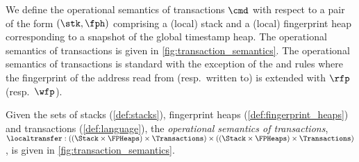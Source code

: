 We define the operational semantics of transactions $\cmd$ with respect to a pair of the form $(\stk, \fph)$ comprising a (local) stack and a (local) fingerprint heap corresponding to a snapshot of the global timestamp heap. The operational semantics of transactions is given in \fig\ref{fig:transaction_semantics}.
The operational semantics of transactions is standard with the exception of the  and  rules where the fingerprint of the address read from (resp.~written to) is extended with $\rfp$ (resp.~$\wfp$).


\begin{definition}
Given the sets of stacks (\ref{def:stacks}), fingerprint heaps (\ref{def:fingerprint_heaps}) and transactions (\ref{def:language}), the \emph{operational semantics of transactions}, $\localtransfer : ((\Stack \times \FPHeaps) \times \Transactions) \times ((\Stack \times \FPHeaps) \times \Transactions)$, is given in \fig\ref{fig:transaction_semantics}.
\end{definition}

